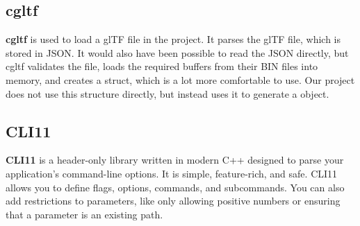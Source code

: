 \subsection{cgltf}

\textbf{cgltf} is used to load a glTF file in the project. It parses the glTF file, which is stored in JSON. It would also have been possible to read the JSON directly, but cgltf validates the file, loads the required buffers from their BIN files into memory, and creates a  struct, which is a lot more comfortable to use. Our project does not use this structure directly, but instead uses it to generate a  object.

\subsection{CLI11}

\textbf{CLI11} is a header-only library written in modern C++ designed to parse your application's command-line options. It is simple, feature-rich, and safe. CLI11 allows you to define flags, options, commands, and subcommands. You can also add restrictions to parameters, like only allowing positive numbers or ensuring that a parameter is an existing path.